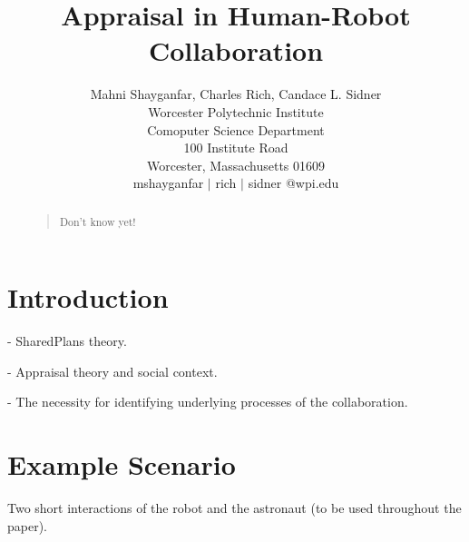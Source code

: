 \documentclass[letterpaper]{article}
\begin{document}
%
\title{Appraisal in Human-Robot Collaboration}
\author{Mahni Shayganfar, Charles Rich, Candace L. Sidner\\
Worcester Polytechnic Institute\\
Comoputer Science Department\\
100 Institute Road\\
Worcester, Massachusetts 01609\\
mshayganfar $|$ rich $|$ sidner @wpi.edu
}
\maketitle
\begin{abstract}
\begin{quote}
Don't know yet!\end{quote}
\end{abstract}

\section{Introduction}

- SharedPlans theory.

\noindent - Appraisal theory and social context.

\noindent - The necessity for identifying underlying processes of the
collaboration.

\section{Example Scenario}

Two short interactions of the robot and the astronaut (to be used throughout
the paper).
\end{document}
